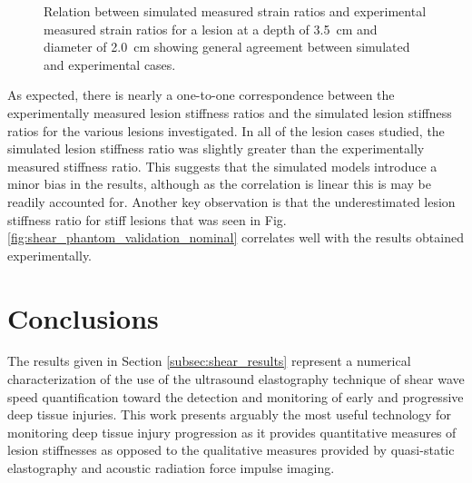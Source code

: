 			\begin{figure}[!htb]
				\centering
				\caption[Experimental validation of shear wave speed quantification model results]{Relation between simulated measured strain ratios and experimental measured strain ratios for a lesion at a depth of \SI{3.5}{\cm} and diameter of \SI{2.0}{\cm} showing general agreement between simulated and experimental cases.}
				\label{fig:shear_phantom_validation}
			\end{figure}

			As expected, there is nearly a one-to-one correspondence between the experimentally measured lesion stiffness ratios and the simulated lesion stiffness ratios for the various lesions investigated. In all of the lesion cases studied, the simulated lesion stiffness ratio was slightly greater than the experimentally measured stiffness ratio. This suggests that the simulated models introduce a minor bias in the results, although as the correlation is linear this is may be readily accounted for. Another key observation is that the underestimated lesion stiffness ratio for stiff lesions that was seen in Fig. \ref{fig:shear_phantom_validation_nominal} correlates well with the results obtained experimentally.

	\section{Conclusions}
		The results given in Section \ref{subsec:shear_results} represent a numerical characterization of the use of the ultrasound elastography technique of shear wave speed quantification toward the detection and monitoring of early and progressive deep tissue injuries. This work presents arguably the most useful technology for monitoring deep tissue injury progression as it provides quantitative measures of lesion stiffnesses as opposed to the qualitative measures provided by quasi-static elastography and acoustic radiation force impulse imaging.

